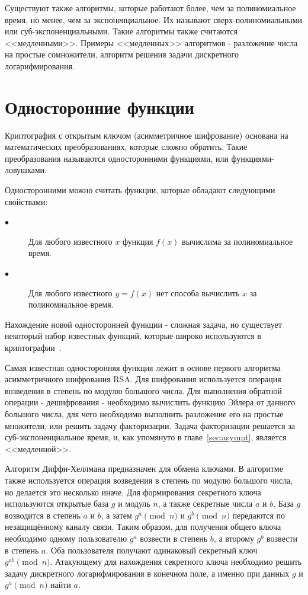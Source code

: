 \documentclass[times,specification,annotation]{itmo-student-thesis}
\begin{document}
Существуют также алгоритмы, которые работают более, чем за полиномиальное время, но менее, чем за экспоненциальное.
Их называют сверх-полиномиальными или суб-экспоненциальными.
Такие алгоритмы также считаются <<медленными>>.
Примеры <<медленных>> алгоритмов - разложение числа на простые сомножители, алгоритм решения задачи
дискретного логарифмирования.


\section{Односторонние функции}\label{sec:func}

Криптография с открытым ключом (асимметричное шифрование) основана на математических преобразованиях, которые сложно обратить.
Такие преобразования называются односторонними функциями, или функциями-ловушками.

Односторонними можно считать функции, которые обладают следующими свойствами:
\begin{description}
  \item[$\bullet$] Для любого известного $x$ функция $f(x)$ вычислима за полиномиальное время.
  \item[$\bullet$] Для любого известного $y=f(x)$ нет способа вычислить $x$ за полиномиальное время.
\end{description}
Нахождение новой односторонней функции - сложная задача, но существует некоторый набор известных функций,
которые широко используются в криптографии~\cite{sma15, men01}.\par
Самая известная односторонняя функция лежит в основе первого алгоритма асимметричного шифрования RSA\@.
Для шифрования используется операция возведения в степень по модулю большого числа.
Для выполнения обратной операции - дешифрования - необходимо вычислить функцию Эйлера
от данного большого числа, для чего необходимо выполнить разложение его на простые множители, или решить задачу факторизации.
Задача факторизации решается за суб-экспоненциальное время, и, как упомянуто в главе~\ref{sec:asympt}, является <<медленной>>.

Алгоритм Диффи-Хеллмана предназначен для обмена ключами.
В алгоритме также используется операция возведения в степень по модулю большого числа, но делается это несколько иначе.
Для формирования секретного ключа используются открытые база $g$ и модуль $n$, а также секретные числа $a$ и $b$.
База $g$ возводится в степень $a$ и $b$, а затем $g^a\pmod{n}$ и $g^b\pmod{n}$ передаются по незащищённому каналу связи.
Таким образом, для получения общего ключа необходимо одному пользователю $g^a$ возвести в степень $b$,
а второму $g^b$ возвести в степень $a$.
Оба пользователя получают одинаковый секретный ключ $g^{ab}\pmod{n}$.
Атакующему для нахождения секретного ключа необходимо решить задачу дискретного логарифмирования в конечном поле,
а именно при данных $g$ и $g^a\pmod{n}$ найти $a$.
\end{document}

